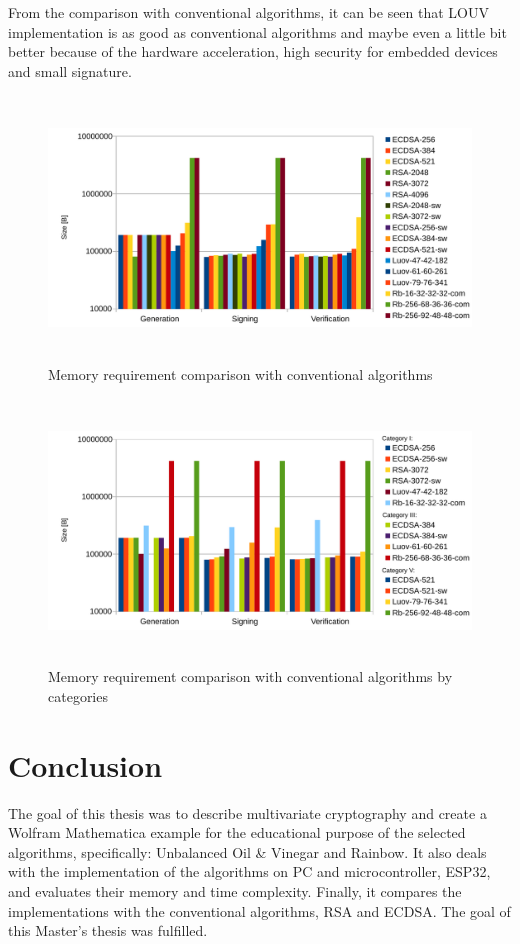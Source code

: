\documentclass[thesis=M,english]{FITthesis}[2019/12/23]
\begin{document}
\bigskip
\noindent
From the comparison with conventional algorithms, it can be seen that LOUV implementation is as good as conventional algorithms and maybe even a little bit better because of the hardware acceleration, high security for embedded devices and small signature.

\bigskip
\begin{figure}[H]
\centering
\includegraphics[width=13cm,height=7cm]{images/mem-all.pdf}
\caption{Memory requirement comparison with conventional algorithms}
\label{mem-all}
\end{figure}

\bigskip\bigskip\bigskip
\begin{figure}[H]
\centering
\includegraphics[width=13cm,height=7cm]{images/mem-category-all.pdf}
\caption{Memory requirement comparison with conventional algorithms by categories}
\label{mem-category-all}
\end{figure}

\chapter{Conclusion}
The goal of this thesis was to describe multivariate cryptography and create a Wolfram Mathematica example for the educational purpose of the selected algorithms, specifically: Unbalanced Oil \& Vinegar and Rainbow. It also deals with the implementation of the algorithms on PC and microcontroller, ESP32, and evaluates their memory and time complexity. Finally, it compares the implementations with the conventional algorithms, RSA and ECDSA. The goal of this Master's thesis was fulfilled.
\end{document}
